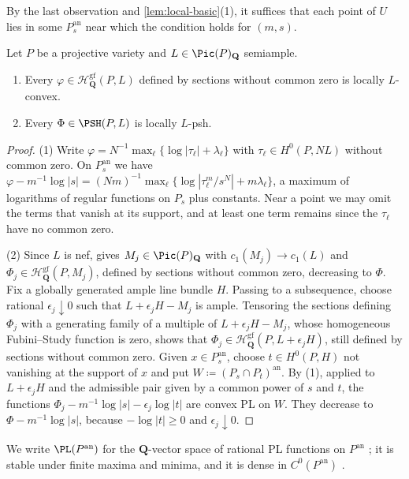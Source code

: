 \documentclass[11pt,a4paper]{article}
\newcommand{\an}{\mathrm{an}}          %
\begin{document}
By the last observation and \cref{lem:local-basic}(1), it suffices that each point of $U$ lies in some $P_s^{\an}$ near which the condition holds for $(m,s)$.

\begin{lemma}\label{lem:global-to-local}
Let $P$ be a projective variety and $L\in\Pic(P)_{\mathbf Q}$ semiample.
\begin{enumerate}
\item Every $\varphi\in\mathcal{H}^{\mathrm{gf}}_{\mathbf{Q}}(P,L)$ defined by sections without common zero is locally $L$-convex.
\item Every $\Phi\in\PSH(P,L)$ is locally $L$-psh.
\end{enumerate}
\end{lemma}

\begin{proof}
(1) Write $\varphi=N^{-1}\max_\ell\{\log|\tau_\ell|+\lambda_\ell\}$ with $\tau_\ell\in H^0(P,NL)$ without common zero. On $P_s^{\an}$ we have $\varphi-m^{-1}\log|s|=(Nm)^{-1}\max_\ell\{\log|\tau_\ell^m/s^N|+m\lambda_\ell\}$, a maximum of logarithms of regular functions on $P_s$ plus constants. Near a point we may omit the terms that vanish at its support, and at least one term remains since the $\tau_\ell$ have no common zero.

(2) Since $L$ is nef, \cite[Corollary~12.18(ii)]{BJ22} gives $M_j\in\Pic(P)_{\mathbf Q}$ with $c_1(M_j)\to c_1(L)$ and $\Phi_j\in\mathcal{H}^{\mathrm{gf}}_{\mathbf{Q}}(P,M_j)$, defined by sections without common zero, decreasing to $\Phi$. Fix a globally generated ample line bundle $H$. Passing to a subsequence, choose rational $\epsilon_j\downarrow0$ such that $L+\epsilon_jH-M_j$ is ample. Tensoring the sections defining $\Phi_j$ with a generating family of a multiple of $L+\epsilon_jH-M_j$, whose homogeneous Fubini--Study function is zero, shows that $\Phi_j\in\mathcal{H}^{\mathrm{gf}}_{\mathbf{Q}}(P,L+\epsilon_jH)$, still defined by sections without common zero. Given $x\in P_s^{\an}$, choose $t\in H^0(P,H)$ not vanishing at the support of $x$ and put $W\coloneqq(P_s\cap P_t)^{\an}$. By (1), applied to $L+\epsilon_jH$ and the admissible pair given by a common power of $s$ and $t$, the functions $\Phi_j-m^{-1}\log|s|-\epsilon_j\log|t|$ are convex PL on $W$. They decrease to $\Phi-m^{-1}\log|s|$, because $-\log|t|\ge0$ and $\epsilon_j\downarrow0$.
\end{proof}

We write $\PL(P^{\an})$ for the $\mathbf Q$-vector space of rational PL functions on $P^{\an}$ \cite[\S2]{BJ22}; it is stable under finite maxima and minima, and it is dense in $C^0(P^{\an})$ \cite[Theorem~2.2]{BJ22}.
\end{document}
